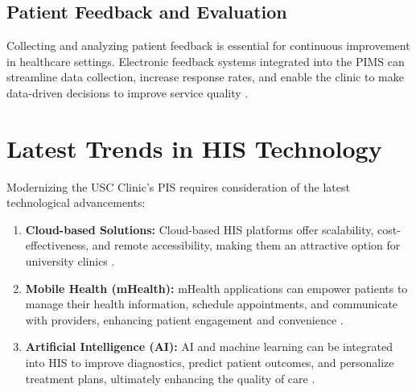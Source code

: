 \subsection{Patient Feedback and Evaluation}
Collecting and analyzing patient feedback is essential for continuous improvement in healthcare settings. Electronic feedback systems integrated into the PIMS can streamline data collection, increase response rates, and enable the clinic to make data-driven decisions to improve service quality \cite{ferreira2023}.

\section{Latest Trends in HIS Technology}

Modernizing the USC Clinic’s PIS requires consideration of the latest technological advancements:

\begin{enumerate}
    \item \textbf{Cloud-based Solutions:} Cloud-based HIS platforms offer scalability, cost-effectiveness, and remote accessibility, making them an attractive option for university clinics \cite{ali2023}.
    \item \textbf{Mobile Health (mHealth):} mHealth applications can empower patients to manage their health information, schedule appointments, and communicate with providers, enhancing patient engagement and convenience \cite{free2013}.
    \item \textbf{Artificial Intelligence (AI):} AI and machine learning can be integrated into HIS to improve diagnostics, predict patient outcomes, and personalize treatment plans, ultimately enhancing the quality of care \cite{ching2018}.
\end{enumerate}
